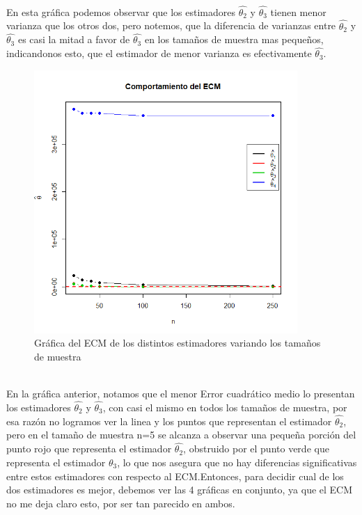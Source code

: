 \documentclass[letterpaper,12pt,onecolumn,titlepage]{article}
\begin{document}
~\\ En esta gr\'{a}fica podemos observar que los estimadores $\hat{\theta_2}$ y $\hat{\theta_3}$ tienen menor varianza que los otros dos, pero notemos, que la diferencia de varianzas entre $\hat{\theta_2}$ y $\hat{\theta_3}$ es casi la mitad a favor de $\hat{\theta_3}$ en los tama\~{n}os de muestra mas peque\~{n}os, indicandonos esto, que el estimador de menor varianza es efectivamente $\hat{\theta_3}$.
\pagebreak \begin{figure}[!h]
    \begin{center}
        \includegraphics[width=10cm]{Figuras/ECM.png}
        \caption{Gr\'{a}fica del ECM de los distintos estimadores variando los tama\~{n}os de muestra}
        \label{fig:Densidad}
    \end{center}
\end{figure}
~\\ En la gr\'{a}fica anterior, notamos que el menor Error cuadr\'{a}tico medio lo presentan los estimadores $\hat{\theta_2}$ y $\hat{\theta_3}$, con casi el mismo en todos los tama\~{n}os de muestra, por esa raz\'{o}n no logramos ver la linea y los puntos que representan el estimador $\hat{\theta_2}$, pero en el tama\~{n}o de muestra n=5 se alcanza a observar una peque\~{n}a porci\'{o}n del punto rojo que representa el estimador $\hat{\theta_2}$, obstruido por el punto verde que representa el estimador $\hat{\theta_3}$, lo que nos asegura que no hay diferencias significativas entre estos estimadores con respecto al ECM.Entonces, para decidir cual de los dos estimadores es mejor, debemos ver las 4 gr\'{a}ficas en conjunto, ya que el ECM no me deja claro esto, por ser tan parecido en ambos.
\end{document}
